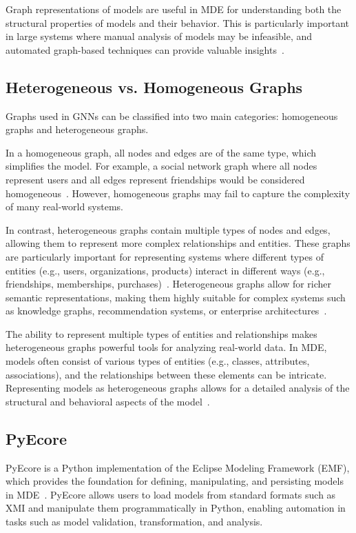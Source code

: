 \documentclass[journal,article,submit,moreauthors,technologies]{Definitions/mdpi}
\begin{document}
Graph representations of models are useful in MDE for understanding both the structural properties of models and their behavior. This is particularly important in large systems where manual analysis of models may be infeasible, and automated graph-based techniques can provide valuable insights~\cite{shi2016survey}.

\subsection{Heterogeneous vs. Homogeneous Graphs} \label{sec:heterogeneous_vs_homogeneous}
Graphs used in GNNs can be classified into two main categories: homogeneous graphs and heterogeneous graphs.

In a homogeneous graph, all nodes and edges are of the same type, which simplifies the model. For example, a social network graph where all nodes represent users and all edges represent friendships would be considered homogeneous~\cite{wu2020comprehensive}. However, homogeneous graphs may fail to capture the complexity of many real-world systems.

In contrast, heterogeneous graphs contain multiple types of nodes and edges, allowing them to represent more complex relationships and entities. These graphs are particularly important for representing systems where different types of entities (e.g., users, organizations, products) interact in different ways (e.g., friendships, memberships, purchases)~\cite{shi2016survey}. Heterogeneous graphs allow for richer semantic representations, making them highly suitable for complex systems such as knowledge graphs, recommendation systems, or enterprise architectures~\cite{wang2019heterogeneous, yu2019heterogeneous}.

The ability to represent multiple types of entities and relationships makes heterogeneous graphs powerful tools for analyzing real-world data. In MDE, models often consist of various types of entities (e.g., classes, attributes, associations), and the relationships between these elements can be intricate. Representing models as heterogeneous graphs allows for a detailed analysis of the structural and behavioral aspects of the model~\cite{shi2016survey}.

\subsection{PyEcore} \label{sec:pyecore}
PyEcore is a Python implementation of the Eclipse Modeling Framework (EMF), which provides the foundation for defining, manipulating, and persisting models in MDE~\cite{aranega2017pyecore}. PyEcore allows users to load models from standard formats such as XMI and manipulate them programmatically in Python, enabling automation in tasks such as model validation, transformation, and analysis.
\end{document}
